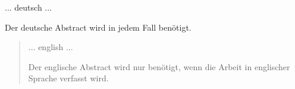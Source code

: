 

\begin{abstractgerman}
... deutsch ...

Der deutsche Abstract wird in jedem Fall benötigt.
\clearpage
\end{abstractgerman}
\newpage

\begin{abstract}
\label{sec:abstract}
... english ...

Der englische Abstract wird nur benötigt, wenn die Arbeit in englischer Sprache verfasst wird.
\clearpage
\end{abstract}

